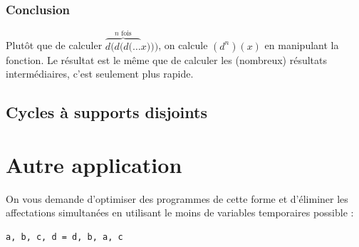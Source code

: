 \documentclass[11pt,a4paper,oneside]{book}
\begin{document}

\subsubsection{Conclusion}
Plutôt que de calculer $\overbrace{d(d(d(\dots}^\text{$n$ fois} x)))$,
on calcule $\left(d^n\right)(x)$ en manipulant la fonction. Le résultat est le
même que de calculer les (nombreux) résultats intermédiaires, c'est seulement
plus rapide.

\subsection{Cycles à supports disjoints}


\section{Autre application} %
On vous demande d'optimiser des programmes de cette forme et d'éliminer les
affectations simultanées en utilisant le moins de variables temporaires
possible :
\begin{verbatim}
a, b, c, d = d, b, a, c
\end{verbatim}
\end{document}
